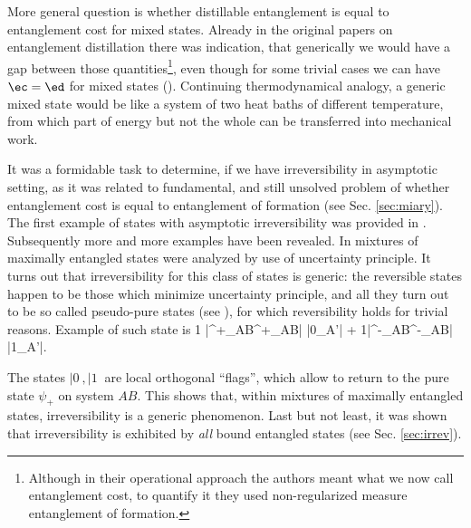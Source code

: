 \documentclass[twocolumn,aps,rmp]{revtex4}
\begin{document}
More general question is whether distillable entanglement is equal to entanglement
cost for mixed states. Already in the original papers on entanglement distillation \cite{BBPSSW1996,BDSW1996}
there was indication, that generically we would have a gap
between those quantities\footnote{Although in their operational approach
the authors meant what we now call entanglement cost, to
quantify it they used non-regularized measure entanglement of formation.
},
even though for some trivial cases we can have $\ec=\ed$ for mixed states (\cite{termo}).
Continuing thermodynamical analogy, a generic mixed state would be like
a system of two heat baths of different temperature, from which part of energy but not the whole can be transferred into mechanical work.

It was a formidable task to determine, if we have irreversibility in asymptotic setting,
as it was related to fundamental, and still unsolved problem of whether entanglement cost is equal to  entanglement of formation (see Sec. \ref{sec:miary}).
The first example of states with asymptotic irreversibility was
provided in \cite{VidalC-irre}. Subsequently more and more
examples have been revealed. In \cite{VollbrechtWW2003-irrev}
mixtures of maximally entangled states were analyzed by use of
uncertainty principle. It turns out that irreversibility for this
class of states is generic: the reversible states happen to be those
which minimize uncertainty principle, and all they turn out to be so
called pseudo-pure states (see \cite{termo}), for which
reversibility holds for trivial reasons.  Example of such state is
\be
{1} |\psi^+_{AB}\>\<\psi^+_{AB}| \ot |0\>_{A'}| +
{1}|\psi^-_{AB}\>\<\psi^-_{AB}| \ot |1\>_{A'}|.
\ee

The states
$|0\>,|1\>$ are local orthogonal ``flags'', which allow to return to the
pure state $\psi_+$ on system $AB$. This shows that, within mixtures
of maximally entangled  states, irreversibility is a generic
phenomenon. Last but not least, it was shown that irreversibility is
exhibited by {\it all} bound entangled states
\cite{YangHHS2005-cost} (see Sec. \ref{sec:irrev}).
\end{document}
